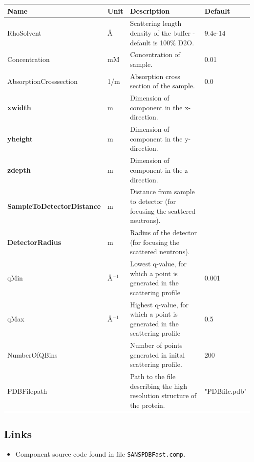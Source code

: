 \begin{longtable}{p{}p{}p{}p{}}
\toprule
\textbf{Name} & \textbf{Unit} & \textbf{Description} & \textbf{Default} \\
\midrule
\endhead
RhoSolvent & \AA{} & Scattering length density of the buffer - default is 100\% D2O. & 9.4e-14 \\
Concentration & mM & Concentration of sample. & 0.01 \\
AbsorptionCrosssection & 1/m & Absorption cross section of the sample. & 0.0 \\
\textbf{xwidth} & m & Dimension of component in the x-direction. &  \\
\textbf{yheight} & m & Dimension of component in the y-direction. &  \\
\textbf{zdepth} & m & Dimension of component in the z-direction. &  \\
\textbf{SampleToDetectorDistance} & m & Distance from sample to detector (for focusing the scattered neutrons). &  \\
\textbf{DetectorRadius} & m & Radius of the detector (for focusing the scattered neutrons). &  \\
qMin & \AA{}$^{-1}$ & Lowest q-value, for which a point is generated in the scattering profile & 0.001 \\
qMax & \AA{}$^{-1}$ & Highest q-value, for which a point is generated in the scattering profile & 0.5 \\
NumberOfQBins &  & Number of points generated in inital scattering profile. & 200 \\
PDBFilepath &  & Path to the file describing the high resolution structure of the protein. & "PDBfile.pdb" \\
\bottomrule
\end{longtable}

\subsection*{Links}
\begin{itemize}
  \item Component source code found in file \texttt{SANSPDBFast.comp}.
\end{itemize}
